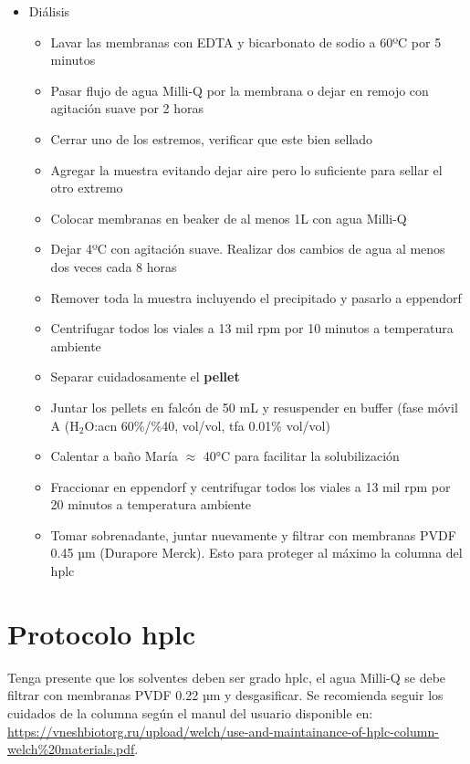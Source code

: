 \begin{appendix}
\begin{itemize}
    \item{Diálisis}
    \begin{itemize}
        \item{Lavar las membranas con EDTA y bicarbonato de sodio a 60ºC por 5 minutos}
        \item{Pasar flujo de agua Milli-Q por la membrana o dejar en remojo con agitación suave por 2 horas}
        \item{Cerrar uno de los estremos, verificar que este bien sellado}
        \item{Agregar la muestra evitando dejar aire pero lo suficiente para sellar el otro extremo}
        \item{Colocar membranas en beaker de al menos 1L con agua Milli-Q
        }
        \item{Dejar 4ºC con agitación suave. Realizar dos cambios de agua al menos dos veces cada 8 horas}
        \item{Remover toda la muestra incluyendo el precipitado y pasarlo a eppendorf}
        \item{Centrifugar todos los viales a 13 mil \ac{rpm} por 10 minutos a temperatura ambiente}
        \item{Separar cuidadosamente el \textbf{pellet}}
        \item{Juntar los pellets en falcón de 50 mL y resuspender en buffer (fase móvil A (H$_{2}$O:\ac{acn} 60\%/\%40, vol/vol, \ac{tfa} 0.01\% vol/vol)}
        \item{Calentar a baño María $\approx$ 40°C para facilitar la solubilización}
        \item{Fraccionar en eppendorf y centrifugar todos los viales a 13 mil \ac{rpm} por 20 minutos a temperatura ambiente}
        \item{Tomar sobrenadante, juntar nuevamente y filtrar con membranas PVDF 0.45 µm (Durapore Merck). Esto para proteger al máximo la columna del \ac{hplc}}
    \end{itemize}

    
\end{itemize}


\chapter{Protocolo \ac{hplc}}\label{Protocolo_HPLC}
Tenga presente que los solventes deben ser grado \ac{hplc}, el agua Milli-Q se debe filtrar con membranas PVDF 0.22 µm y desgasificar. Se recomienda seguir los cuidados de la columna según el manul del usuario disponible en: \url{https://vneshbiotorg.ru/upload/welch/use-and-maintainance-of-hplc-column-welch%20materials.pdf}.


\end{appendix}
